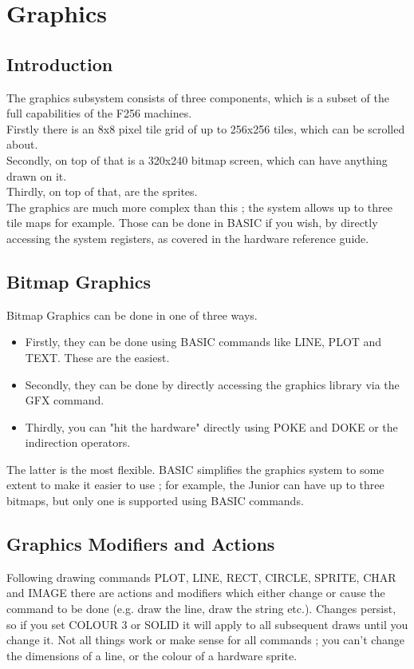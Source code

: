 \chapter{Graphics}

\section{Introduction}

The graphics subsystem consists of three components, which is a subset of the full capabilities of the F256 machines.\\

Firstly there is an 8x8 pixel tile grid of up to 256x256 tiles, which can be scrolled about.\\

Secondly, on top of that is a 320x240 bitmap screen, which can have anything drawn on it.\\

Thirdly, on top of that, are the sprites.\\

The graphics are much more complex than this ; the system allows up to three tile maps for example. Those can be done in BASIC if you wish, by directly accessing the system registers, as covered in the hardware reference guide.\\

\section{Bitmap Graphics}

Bitmap Graphics can be done in one of three ways. 

\begin{itemize}
\item Firstly, they can be done using BASIC commands like LINE, PLOT and TEXT. These are the easiest.
\item Secondly, they can be done by directly accessing the graphics library via the GFX command. 
\item Thirdly, you can "hit the hardware" directly using POKE and DOKE or the indirection operators.
\end{itemize}
The latter is the most flexible. BASIC simplifies the graphics system to some extent to make it easier to use ; for example, the Junior can have up to three bitmaps, but only one is supported using BASIC commands.

\section{Graphics Modifiers and Actions}
Following drawing commands PLOT, LINE, RECT, CIRCLE, SPRITE, CHAR and IMAGE there are actions and modifiers which either change or cause the command to be done (e.g. draw the line, draw the string etc.). 
Changes persist, so if you set COLOUR 3 or SOLID it will apply to all subsequent draws until you change it.
Not all things work or make sense for all commands ; you can’t change the dimensions of a line, or the colour of a hardware sprite.

